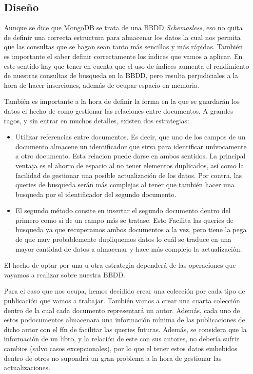 \subsection{Diseño}

Aunque se dice que MongoDB se trata de una \gls{BBDD} \textit{Schemasless}, eso no quita de definir una correcta estructura para almacenar los datos la cual nos permita que las consultas que se hagan sean tanto más sencillas y más rápidas. También es importante el saber definir correctamente los índices que vamos a aplicar. En este sentido hay que tener en cuenta que el uso de índices aumenta el rendimiento de nuestras consultas de busqueda en la \gls{BBDD}, pero resulta perjudiciales a la hora de hacer inserciones, además de ocupar espacio en memoria.

También es importante a la hora de definir la forma en la que se guardarán los datos el hecho de como gestionar las relaciones entre documentos. A grandes ragos, y sin entrar en muchos detalles, existen dos estrategias:

\begin{itemize}
 \item Utilizar referencias entre documentos. Es decir, que uno de los campos de un documento almacene un identificador que sirva para identificar unívocamente a otro documento. Esta relacion puede darse en ambos sentidos. La principal ventaja es el ahorro de espacio al no tener elementos duplicados, así como la facilidad de gestionar una posible actualización de los datos. Por contra, las queries de busqueda serán más complejas al tener que también hacer una busqueda por el identificador del segundo documento.
 \item El segundo método consite en insertar el segundo documento dentro del primero como si de un campo más se tratase. Esto Facilita las queries de busqueda ya que recuperamos ambos documentos a la vez, pero tiene la pega de que muy probablemente dupliquemos datos lo cuál se traduce en una mayor cantidad de datos a almacenar y hace más complejo la actualización.
\end{itemize}

El hecho de optar por una u otra estrategia dependerá de las operaciones que vayamos a realizar sobre nuestra \gls{BBDD}. 

Para el caso que nos ocupa, hemos decidido crear una colección por cada tipo de publicación que vamos a trabajar. También vamos a crear una cuarta colección dentro de la cual cada documento representará un autor. Además, cada uno de estos podocumentos almacenara una información mínima de las publicaciones de dicho autor con el fín de facilitar las queries futuras. Además, se considera que la información de un libro, y la relación de este con sus autores, no debería sufrir cambios (salvo casos excepcionales), por lo que el tener estos datos embebidos dentro de otros no supondrá un gran problema a la hora de gestionar las actualizaciones.

